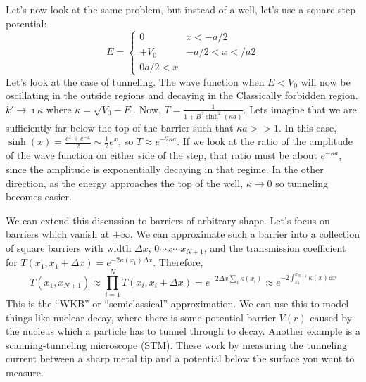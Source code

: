 \documentclass[a4paper,twoside,master.tex]{subfiles}
\begin{document}
Let's now look at the same problem, but instead of a well, let's use a square step potential:
\begin{equation}
    E = \begin{cases} 0 & x<-a/2\\ +V_0 & -a/2<x</a2 \\ 0 a/2 < x  \end{cases}
\end{equation}
Let's look at the case of tunneling. The wave function when $ E < V_0 $ will now be oscillating in the outside regions and decaying in the Classically forbidden region. $ k' \to \imath \kappa $ where $ \kappa = \sqrt{V_0 - E} $. Now, $ T = \frac{1}{1 + B^2 \sinh^2(\kappa a)} $. Lets imagine that we are sufficiently far below the top of the barrier such that $ \kappa a >> 1 $. In this case, $ \sinh(x) = \frac{e^x + e^{-x}}{2} \sim \frac{1}{2} e^{x} $, so $ T\approx e^{-2\kappa a} $. If we look at the ratio of the amplitude of the wave function on either side of the step, that ratio must be about $ e^{- \kappa a} $, since the amplitude is exponentially decaying in that regime. In the other direction, as the energy approaches the top of the well, $ \kappa \to 0 $ so tunneling becomes easier.

We can extend this discussion to barriers of arbitrary shape. Let's focus on barriers which vanish at $ \pm\infty $. We can approximate such a barrier into a collection of square barriers with width $ \Delta x $, $ 0 \cdots x \cdots x_{N+1} $, and the transmission coefficient for $ T(x_1, x_1+ \Delta x) = e^{-2 \kappa(x_1) \Delta x} $. Therefore,
\begin{equation}
    T(x_1, x_{N+1}) \approx \prod_{i=1}^{N} T(x_i, x_i + \Delta x) = e^{-2 \Delta x \sum_{i} \kappa(x_i)} \approx e^{-2 \int_{x_1}^{x_{N+1}} \kappa(x) \dd{x}} 
\end{equation}
This is the ``WKB'' or ``semiclassical'' approximation. We can use this to model things like nuclear decay, where there is some potential barrier $ V(r) $ caused by the nucleus which a particle has to tunnel through to decay. Another example is a scanning-tunneling microscope (STM). These work by measuring the tunneling current between a sharp metal tip and a potential below the surface you want to measure.
\end{document}
